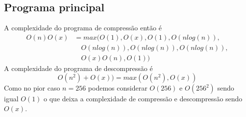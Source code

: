\documentclass[a4paper, 11pt]{article}
\begin{document}
\subsection{Programa principal}
A complexidade do programa de compressão então é 
\begin{equation*}
\begin{split}
O(n)O(x)& = max(O(1),O(x),O(1),O(nlog(n)),\\
        & \quad O(nlog(n)),O(nlog(n)),O(nlog(n)),\\
        & \quad O(x)O(n),O(1))
\end{split}
\end{equation*}
A complexidade do programa de descompressão é
\begin{equation*}
O(n^2) + O(x)) = max(O(n^2),O(x))
\end{equation*}
Como no pior caso $n = 256$ podemos considerar $O(256)$ e $O(256^2)$ sendo igual $O(1)$ o que deixa a complexidade de compressão e descompressão sendo $O(x)$.
\end{document}
